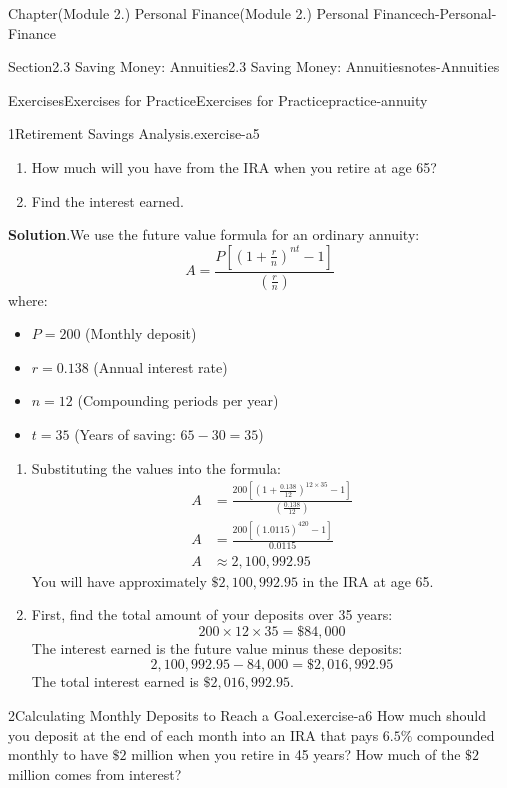 \documentclass[oneside,10pt,]{book}
\newcommand{\blocktitlefont}{\relax}
\newcommand{\ptxlistdisc}{\raisebox{0.3ex}{\textbullet}}
\newcommand{\amp}{&}
\begin{document}
\begin{chapterptx}{Chapter}{(Module 2.) Personal Finance}{}{(Module 2.) Personal Finance}{}{}{ch-Personal-Finance}
\begin{sectionptx}{Section}{2.3 Saving Money: Annuities}{}{2.3 Saving Money: Annuities}{}{}{notes-Annuities}
\begin{exercises-subsection-numberless}{Exercises}{Exercises for Practice}{}{Exercises for Practice}{}{}{practice-annuity}
\begin{divisionexercise}{1}{Retirement Savings Analysis.}{}{exercise-a5}
\begin{enumerate}[label={\arabic*}]
\item{}How much will you have from the IRA when you retire at age 65?%
\item{}Find the interest earned.%
\end{enumerate}
%
\par\smallskip%
\noindent\textbf{\blocktitlefont Solution}.\hypertarget{exercise-a5-3}{}\quad{}We use the future value formula for an ordinary annuity:%
\begin{equation*}
A = \frac{P\left[\left(1+\frac{r}{n}\right)^{nt}-1\right]}{\left(\frac{r}{n}\right)}
\end{equation*}
where:%
\begin{itemize}[label=\ptxlistdisc]
\item{}\(P = 200\) (Monthly deposit)%
\item{}\(r = 0.138\) (Annual interest rate)%
\item{}\(n = 12\) (Compounding periods per year)%
\item{}\(t = 35\) (Years of saving: \(65 - 30 = 35\))%
\end{itemize}
%
\par
%
\begin{enumerate}[label={\arabic*}]
\item{}Substituting the values into the formula:%
\begin{align*}
A \amp = \frac{200\left[\left(1 + \frac{0.138}{12}\right)^{12 \times 35} - 1\right]}{\left(\frac{0.138}{12}\right)}\\
A \amp = \frac{200\left[(1.0115)^{420} - 1\right]}{0.0115}\\
A \amp \approx 2,100,992.95
\end{align*}
You will have approximately \(\$2,100,992.95\) in the IRA at age 65.%
\item{}First, find the total amount of your deposits over 35 years:%
\begin{equation*}
200 \times 12 \times 35 = \$84,000
\end{equation*}
The interest earned is the future value minus these deposits:%
\begin{equation*}
2,100,992.95 - 84,000 = \$2,016,992.95
\end{equation*}
The total interest earned is \(\$2,016,992.95\).%
\end{enumerate}
%
\end{divisionexercise}%
\begin{divisionexercise}{2}{Calculating Monthly Deposits to Reach a Goal.}{}{exercise-a6}%
How much should you deposit at the end of each month into an IRA that pays \(6.5\%\) compounded monthly to have \(\$2\) million when you retire in 45 years? How much of the \(\$2\) million comes from interest?%

\end{divisionexercise}
\end{exercises-subsection-numberless}
\end{sectionptx}
\end{chapterptx}
\end{document}
